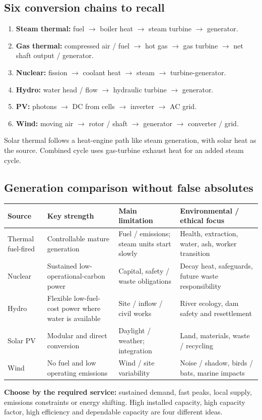 \documentclass[11pt,a4paper]{article}
\begin{document}
\subsection{Six conversion chains to recall}
\begin{enumerate}
\item \textbf{Steam thermal:} fuel $\to$ boiler heat $\to$ steam turbine $\to$ generator.
\item \textbf{Gas thermal:} compressed air / fuel $\to$ hot gas $\to$ gas turbine $\to$ net shaft output / generator.
\item \textbf{Nuclear:} fission $\to$ coolant heat $\to$ steam $\to$ turbine-generator.
\item \textbf{Hydro:} water head / flow $\to$ hydraulic turbine $\to$ generator.
\item \textbf{PV:} photons $\to$ DC from cells $\to$ inverter $\to$ AC grid.
\item \textbf{Wind:} moving air $\to$ rotor / shaft $\to$ generator $\to$ converter / grid.
\end{enumerate}
Solar thermal follows a heat-engine path like steam generation, with solar heat as the source. Combined cycle uses gas-turbine exhaust heat for an added steam cycle.

\subsection{Generation comparison without false absolutes}
\begin{center}\small
\begin{tabularx}{\textwidth}{L{2.4cm}YYY}
\toprule\textbf{Source} & \textbf{Key strength} & \textbf{Main limitation} & \textbf{Environmental / ethical focus}\\\midrule
Thermal fuel-fired & Controllable mature generation & Fuel / emissions; steam units start slowly & Health, extraction, water, ash, worker transition\\
Nuclear & Sustained low-operational-carbon power & Capital, safety / waste obligations & Decay heat, safeguards, future waste responsibility\\
Hydro & Flexible low-fuel-cost power where water is available & Site / inflow / civil works & River ecology, dam safety and resettlement\\
Solar PV & Modular and direct conversion & Daylight / weather; integration & Land, materials, waste / recycling\\
Wind & No fuel and low operating emissions & Wind / site variability & Noise / shadow, birds / bats, marine impacts\\\bottomrule
\end{tabularx}\end{center}
\textbf{Choose by the required service:} sustained demand, fast peaks, local supply, emissions constraints or energy shifting. High installed capacity, high capacity factor, high efficiency and dependable capacity are four different ideas.
\end{document}
